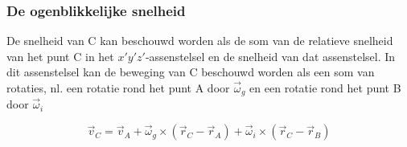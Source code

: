 \subsubsection{De ogenblikkelijke snelheid}
De snelheid van C kan beschouwd worden als de som van de relatieve snelheid van het punt C in het $x'y'z'$-assenstelsel en de snelheid van dat assenstelsel. In dit assenstelsel kan de beweging van C beschouwd worden als een som van rotaties, nl. een rotatie rond het punt A door $\overrightarrow{\omega}_{g}$ en een rotatie rond het punt B door $\overrightarrow{\omega}_{i}$

\begin{equation*}
\overrightarrow{v}_{C}=\overrightarrow{v}_{A}+\overrightarrow{\omega}_{g}\times(\overrightarrow{r}_{C}-\overrightarrow{r}_{A})+\overrightarrow{\omega}_{i}\times(\overrightarrow{r}_{C}-\overrightarrow{r}_{B})
\end{equation*}